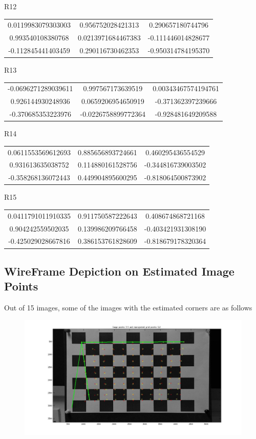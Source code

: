 \documentclass[12pt]{article}
\begin{document}
R12
\begin{tabular}{|c|c|c|}
\hline
0.0119983079303003 &	0.956752028421313 &	0.290657180744796 \\
0.993540108380768 &	0.0213971684467383 &	-0.111446014828677 \\
-0.112845441403459	& 0.290116730462353 &	-0.950314784195370 \\
\hline
\end{tabular}

R13
\begin{tabular}{|c|c|c|}
\hline
-0.0696271289039611 &	0.997567173639519 &	0.00343467574194761 \\
0.926144930248936 &	0.0659206954650919 &	-0.371362397239666 \\
-0.370685353223976 &	-0.0226758899772364 &	-0.928481649209588 \\
\hline
\end{tabular}

R14
\begin{tabular}{|c|c|c|}
\hline
0.0611553569612693 &	0.885656893724661 &	0.460295436554529 \\
0.931613635038752 &	0.114880161528756 &	-0.344816739003502 \\
-0.358268136072443 &	0.449904895600295 &	-0.818064500873902 \\
\hline
\end{tabular}

R15
\begin{tabular}{|c|c|c|}
\hline
0.0411791011910335	& 0.911750587222643 &	0.408674868721168 \\
0.904242559502035 &	0.139986209766458 &	-0.403421931308190 \\
-0.425029028667816 &	0.386153761828609 &	-0.818679178320364 \\
\hline
\end{tabular}
 
\subsection{WireFrame Depiction on Estimated Image Points}
Out of 15 images, some of the images with the estimated corners are as follows
\begin{figure}[htp]
\centering
\includegraphics[width=1\textwidth]{wireFrame5456.jpg}\hfill
\end{figure}
\end{document}
